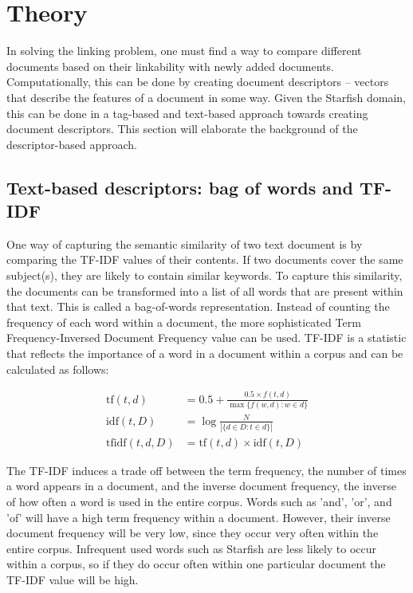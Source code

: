 \section{Theory}

In solving the linking problem, one must find a way to compare different
documents based on their linkability with newly added documents.
Computationally, this can be done by creating document descriptors -- vectors
that describe the features of a document in some way. Given the Starfish
domain, this can be done in a tag-based and text-based approach towards
creating document descriptors. This section will elaborate the background of
the descriptor-based approach. 

\subsection{Text-based descriptors: bag of words and TF-IDF}
One way of capturing the semantic similarity of two text document is by
comparing the TF-IDF values of their contents. If two documents cover the same
subject(s), they are likely to contain similar keywords. To capture this
similarity, the documents can be transformed into a list of all words that are
present within that text. This is called a bag-of-words representation. Instead
of counting the frequency of each word within a document, the more
sophisticated Term Frequency-Inversed Document Frequency value can be used.
TF-IDF is a statistic that reflects the importance of a word in a document
within a corpus and can be calculated as follows:

\begin{align}
  \textrm{tf}(t,d)      &= 0.5 + \frac{0.5 \times {f}(t, d)}{\max\{{f}(w, d):w \in d\}}\\
  \textrm{idf}(t, D)    &=  \log \frac{N}{|\{d \in D: t \in d\}|}\\
  \textrm{tfidf}(t,d,D) &= \textrm{tf}(t,d) \times \textrm{idf}(t, D)
\end{align}

The TF-IDF induces a trade off between the term frequency, the number of times
a word appears in a document, and the inverse document frequency, the inverse
of how often a word is used in the entire corpus. Words such as 'and', 'or',
and 'of' will have a high term frequency within a document. However, their
inverse document frequency will be very low, since they occur very often within
the entire corpus. Infrequent used words such as Starfish are less likely to
occur within a corpus, so if they do occur often within one particular document
the TF-IDF value will be high. 

